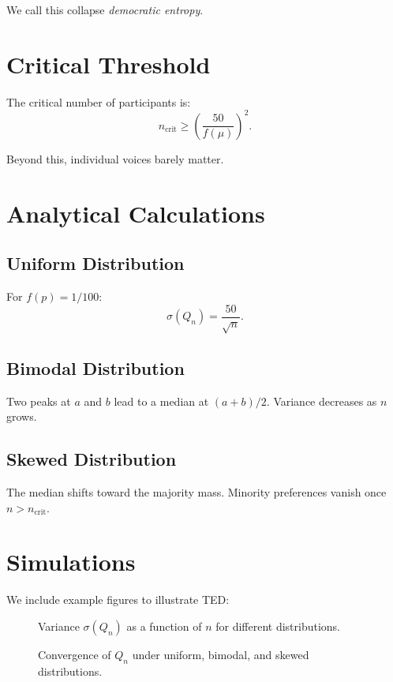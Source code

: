 \documentclass[12pt]{article}
\begin{document}
We call this collapse \emph{democratic entropy}.

\section{Critical Threshold}
The critical number of participants is:
\[
n_{\text{crit}} \geq \left(\frac{50}{f(\mu)}\right)^2.
\]

Beyond this, individual voices barely matter.

\section{Analytical Calculations}
\subsection{Uniform Distribution}
For $f(p)=1/100$:
\[
\sigma(Q_n) = \frac{50}{\sqrt{n}}.
\]

\subsection{Bimodal Distribution}
Two peaks at $a$ and $b$ lead to a median at $(a+b)/2$. 
Variance decreases as $n$ grows.

\subsection{Skewed Distribution}
The median shifts toward the majority mass. Minority 
preferences vanish once $n > n_{\text{crit}}$.

\section{Simulations}
We include example figures to illustrate TED:

\begin{figure}[h]
    \centering
    \caption{Variance $\sigma(Q_n)$ as a function of $n$ for different distributions.}
\end{figure}

\begin{figure}[h]
    \centering
    \caption{Convergence of $Q_n$ under uniform, bimodal, and skewed distributions.}
\end{figure}
\end{document}
